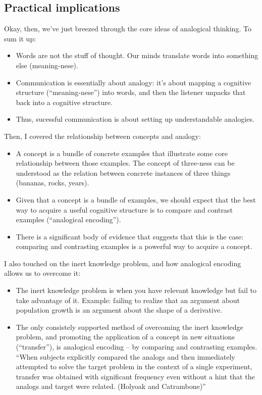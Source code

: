 \subsection{Practical implications}\label{practical-implications}

Okay, then, we've just breezed through the core ideas of analogical
thinking. To sum it up:

\begin{itemize}
\itemsep1pt\parskip0pt
\item
  Words are not the stuff of thought. Our minds translate words into
  something else (meaning-nese).
\item
  Communication is essentially about analogy: it's about mapping a
  cognitive structure (``meaning-nese'') into words, and then the
  listener unpacks that back into a cognitive structure.
\item
  Thus, sucessful communication is about setting up understandable
  analogies.
\end{itemize}

Then, I covered the relationship between concepts and analogy:

\begin{itemize}
\itemsep1pt\parskip0pt
\item
  A concept is a bundle of concrete examples that illustrate some core
  relationship between those examples. The concept of three-ness can be
  understood as the relation between concrete instances of three things
  (bananas, rocks, years).
\item
  Given that a concept is a bundle of examples, we should expect that
  the best way to acquire a useful cognitive structure is to compare and
  contrast examples (``analogical encoding'').
\item
  There is a significant body of evidence that suggests that this is the
  case: comparing and contrasting examples is a powerful way to acquire
  a concept.
\end{itemize}

I also touched on the inert knowledge problem, and how analogical
encoding allows us to overcome it:

\begin{itemize}
\itemsep1pt\parskip0pt
\item
  The inert knowledge problem is when you have relevant knowledge but
  fail to take advantage of it. Example: failing to realize that an
  argument about population growth is an argument about the shape of a
  derivative.
\item
  The only consistely supported method of overcoming the inert knowledge
  problem, and promoting the application of a concept in new situations
  (``transfer''), is analogical encoding -- by comparing and contrasting
  examples. ``When subjects explicitly compared the analogs and then
  immediately attempted to solve the target problem in the context of a
  single experiment, transfer was obtained with significant frequency
  even without a hint that the analogs and target were related. (Holyoak
  and Catrambone)''
\end{itemize}

